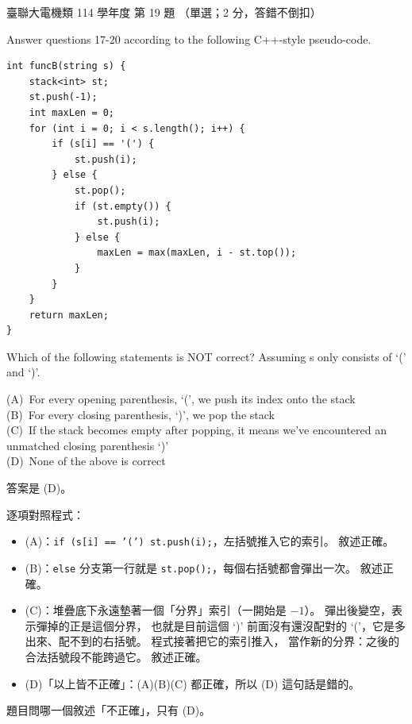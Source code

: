 \begin{pastexam}[label={px:ust-114-ee-ds-19}]{臺聯大電機類 114 學年度 第 19 題}
（單選；2 分，答錯不倒扣）

Answer questions 17-20 according to the following C++-style pseudo-code.
\begin{verbatim}
int funcB(string s) {
    stack<int> st;
    st.push(-1);
    int maxLen = 0;
    for (int i = 0; i < s.length(); i++) {
        if (s[i] == '(') {
            st.push(i);
        } else {
            st.pop();
            if (st.empty()) {
                st.push(i);
            } else {
                maxLen = max(maxLen, i - st.top());
            }
        }
    }
    return maxLen;
}
\end{verbatim}

Which of the following statements is NOT correct? Assuming s only consists of `(' and `)'.

(A)~For every opening parenthesis, `(', we push its index onto the stack\\
(B)~For every closing parenthesis, `)', we pop the stack\\
(C)~If the stack becomes empty after popping, it means we've encountered an unmatched closing
parenthesis `)'\\
(D)~None of the above is correct
\end{pastexam}

\begin{pastsoln}
答案是 (D)。

逐項對照程式：
\begin{itemize}
\item (A)：\texttt{if (s[i] == '(') st.push(i);}，左括號推入它的索引。 敘述正確。
\item (B)：\texttt{else} 分支第一行就是 \texttt{st.pop();}，每個右括號都會彈出一次。 敘述正確。
\item (C)：堆疊底下永遠墊著一個「分界」索引（一開始是 $-1$）。 彈出後變空，表示彈掉的正是這個分界，
也就是目前這個 `)' 前面沒有還沒配對的 `('，它是多出來、配不到的右括號。 程式接著把它的索引推入，
當作新的分界：之後的合法括號段不能跨過它。 敘述正確。
\item (D)「以上皆不正確」：(A)(B)(C) 都正確，所以 (D) 這句話是錯的。
\end{itemize}
題目問哪一個敘述「不正確」，只有 (D)。
\end{pastsoln}
